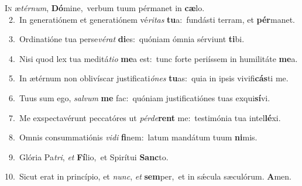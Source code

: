 \lettrine{\initial\textcolor{\initialcolor}{I}}{n} æ\-\textit{tér}\-\textit{num}, \textbf{Dó}\-mine,~\star verbum tuum pérmanet in \textbf{cæ}\-lo.\\
{\numbfont\textcolor{\numbcolor}{~2.}}~In generatiónem et generatiónem vé\-\textit{ri}\-\textit{tas} \textbf{tu}\-a:~\star fundásti terram, et \textbf{pér}\-manet.\par
{\numbfont\textcolor{\numbcolor}{~3.}}~Ordinatióne tua perse\-\textit{vé}\-\textit{rat} \textbf{di}\-es:~\star quóniam ómnia sérviunt \textbf{ti}\-bi.\par
{\numbfont\textcolor{\numbcolor}{~4.}}~Nisi quod lex tua meditá\-\textit{ti}\-\textit{o} \textbf{me}\-a est:~\star tunc forte periíssem in humilitáte \textbf{me}\-a.\par
{\numbfont\textcolor{\numbcolor}{~5.}}~In ætérnum non oblivíscar justificati\-\textit{ó}\-\textit{nes} \textbf{tu}\-as:~\star quia in ipsis vivifi\-\textbf{cás}\-ti me.\par
{\numbfont\textcolor{\numbcolor}{~6.}}~Tuus sum ego, \textit{sal}\-\textit{vum} \textbf{me} fac:~\star quóniam justificatiónes tuas exqui\-\textbf{sí}\-vi.\par
{\numbfont\textcolor{\numbcolor}{~7.}}~Me exspectavérunt peccatóres ut \textit{pér}\-\textit{de}\textbf{rent} me:~\star testimónia tua intel\-\textbf{lé}\-xi.\par
{\numbfont\textcolor{\numbcolor}{~8.}}~Omnis consummatiónis \textit{vi}\-\textit{di} \textbf{fi}\-nem:~\star latum mandátum tuum \textbf{ni}\-mis.\par
{\numbfont\textcolor{\numbcolor}{~9.}}~Glória Pa\-\textit{tri}\-, \textit{et} \textbf{Fí}\-lio,~\star et Spirítui \textbf{Sanc}\-to.\par
{\numbfont\textcolor{\numbcolor}{10.}}~Sicut erat in princípio, et \textit{nunc}\-, \textit{et} \textbf{sem}\-per,~\star et in sǽcula sæculórum. \textbf{A}\-men.\par
